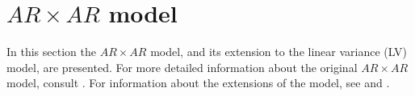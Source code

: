 \section{$AR \times AR$ model}
In this section the $AR \times AR$ model, and its extension to the linear variance (LV) model, are presented. For more detailed information about the original $AR \times AR$ model, consult \textcite{gilmour_accounting_1997}. For information about the extensions of the model, see \textcite{piepho_linear_2010} and \textcite{williams_neighbour_1986}.\\
